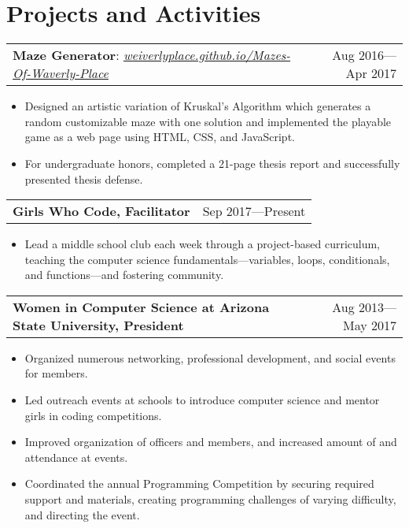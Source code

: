 \documentclass[letterpaper,11pt]{article}
\makeatletter
\newcommand{\resumeItem}[1]{
	\item{
		#1
	}
}
\newcommand{\resumeSubItem}[2]{
	\vspace{-3pt}\item
	\begin{tabular*}{0.97\textwidth}{l@{\extracolsep{\fill}}r}
	\textbf{#1} & {#2} \\
	\end{tabular*}\vspace{-5pt}
}
\newcommand{\resumeSubItemWithLink}[4]{
	\vspace{-3pt}\item
	\begin{tabular*}{0.97\textwidth}{l@{\extracolsep{\fill}}r}
		\textbf{#1}: \textit{\href{#2}{#3}} & {#4} \\
	\end{tabular*}\vspace{-7pt}
}
\newcommand{\resumeSubHeadingListStart}{\begin{description}[leftmargin=*]}
\newcommand{\resumeSubHeadingListEnd}{\end{description}}
\newcommand{\resumeItemListStart}{\begin{itemize}[leftmargin=*,rightmargin=\dimexpr\linewidth-0.92\textwidth-\leftmargin\relax]}
\newcommand{\resumeItemListEnd}{\end{itemize}\vspace{-5pt}}
\makeatother
\begin{document}
	\section{Projects and Activities}
	\resumeSubHeadingListStart
	\resumeSubItemWithLink
	{Maze Generator}{https://weiverlyplace.github.io/Mazes-Of-Waverly-Place}{weiverlyplace.github.io/Mazes-Of-Waverly-Place}{Aug 2016---Apr 2017}
	\resumeItemListStart
	\resumeItem
	{Designed an artistic variation of Kruskal's Algorithm which generates a random customizable maze with one solution and implemented the playable game as a web page using HTML, CSS, and JavaScript.}
	\resumeItem
	{For undergraduate honors, completed a 21-page thesis report and successfully presented thesis defense.}
	\resumeItemListEnd
	\resumeSubItem
	{Girls Who Code, Facilitator}{Sep 2017---Present}
	\resumeItemListStart
	\resumeItem
	{Lead a middle school club each week through a project-based curriculum, teaching the computer science fundamentals---variables, loops, conditionals, and functions---and fostering community.}
	\resumeItemListEnd
	\resumeSubItem
	{Women in Computer Science at Arizona State University, President}{Aug 2013---May 2017}
	\resumeItemListStart
	\resumeItem{Organized numerous networking, professional development, and social events for members.}
	\resumeItem{Led outreach events at schools to introduce computer science and mentor girls in coding competitions.}
	\resumeItem{Improved organization of officers and members, and increased amount of and attendance at events.}
	\resumeItem{Coordinated the annual Programming Competition by securing required support and materials, creating programming challenges of varying difficulty, and directing the event.}
	\resumeItemListEnd
	\resumeSubHeadingListEnd
	
\end{document}
